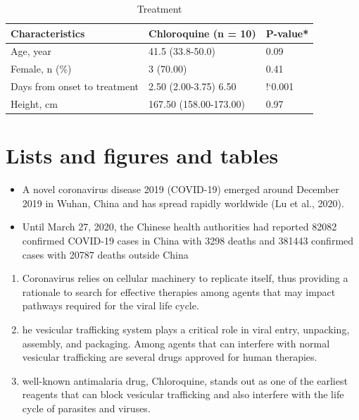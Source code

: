 \documentclass[10pt]{article}
\begin{document}
\begin{table}[hbt!]
\begin{center}
\begin{tabular}{| l | l | l |}
\hline
Characteristics & Chloroquine (n = 10) & P-value* \\
\hline\hline
Age, year & 41.5 (33.8-50.0) & 0.09 \\
\hline
Female, n (\%) & 3 (70.00) & 0.41 \\
\hline
Days from onset to treatment & 2.50 (2.00-3.75) 6.50 & !`0.001 \\
\hline
Height, cm & 167.50 (158.00-173.00) & 0.97 \\
\hline


\end{tabular}
\end{center}
\caption{\label{tab:table-name}Treatment}
\end{table}

\section{Lists and figures and tables}

\begin{itemize}
\item A novel coronavirus disease 2019 (COVID-19) emerged around December
2019 in Wuhan, China and has spread rapidly worldwide (Lu et al., 2020).

\item Until March 27, 2020, the Chinese health authorities had reported 82082
confirmed COVID-19 cases in China with 3298 deaths and 381443 confirmed cases with 20787 deaths outside China
\end{itemize}

\begin{enumerate}

\item Coronavirus relies on cellular machinery to replicate itself, thus providing
a rationale to search for effective therapies among agents that may impact
pathways required for the viral life cycle.

\item he vesicular trafficking system plays a critical role in viral entry, unpacking,
assembly, and packaging. Among agents that can interfere with normal
vesicular trafficking are several drugs approved for human therapies.

\item well-known antimalaria drug, Chloroquine, stands out as one of the earliest
reagents that can block vesicular trafficking and also interfere with the life
cycle of parasites and viruses.
\end{enumerate}
\end{document}
